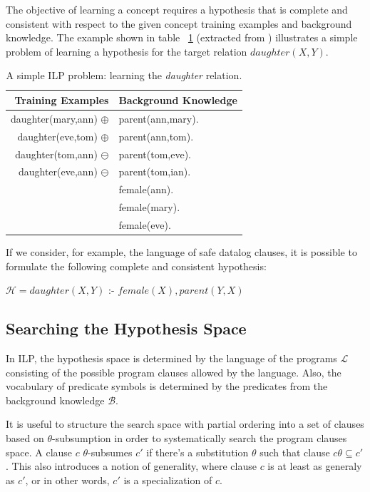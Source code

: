 The objective of learning a concept requires a hypothesis that is complete and consistent with respect to the given
concept training examples and background knowledge. The example shown in table ~\ref{tab:ilpExample} (extracted from
\cite{DBLP:journals/ml/LavracD96}) illustrates a simple problem of learning a hypothesis for the target relation
$daughter(X,Y)$.

\begin{table}[h!]
\label{tab:ilpExample}
\caption{A simple ILP problem: learning the \emph{daughter} relation.}
  \begin{center}
      \begin{tabular}{ r | l }
      \toprule
      \textbf{Training Examples} & \textbf{Background Knowledge}\\
      \midrule
      daughter(mary,ann) $\oplus$	& parent(ann,mary).	\\
      daughter(eve,tom) $\oplus$	& parent(ann,tom).	\\
      daughter(tom,ann) $\ominus$ 	& parent(tom,eve).	\\
      daughter(eve,ann) $\ominus$	& parent(tom,ian).	\\
					& female(ann).		\\
					& female(mary).		\\
					& female(eve).		\\
      \bottomrule
      \end{tabular}
  \end{center}
\end{table}

If we consider, for example, the language of safe datalog clauses, it is possible to formulate the following complete
and consistent hypothesis:

\begin{center}
  $\mathcal{H} = daughter(X,Y)$ :- $female(X),parent(Y,X)$ 
\end{center}

\subsection{Searching the Hypothesis Space}

In ILP, the hypothesis space is determined by the language of the programs $\mathcal{L}$ consisting of the possible
program clauses allowed by the language. Also, the vocabulary of predicate symbols is determined by the predicates
from
the background knowledge $\mathcal{B}$.

It is useful to structure the search space with partial ordering into a set of clauses based on $\theta$-subsumption
in
order to systematically search the program clauses space. A clause $c$ $\theta$-subsumes $c'$ if there's a
substitution $\theta$ such that clause $c\theta \subseteq c'$. This also introduces a notion of generality, where
clause $c$ is at least as generaly as $c'$, or in other words, $c'$ is a specialization of $c$.

